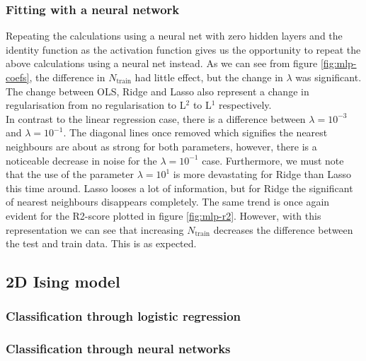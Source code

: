 \subsubsection{Fitting with a neural network}
Repeating the calculations using a neural net with zero hidden layers and the identity function as the activation function gives us the opportunity to repeat the above calculations using a neural net instead. As we can see from figure \ref{fig:mlp-coefs}, the difference in $N_{\text{train}}$ had little effect, but the change in $\lambda$ was significant. The change between OLS, Ridge and Lasso also represent a change in regularisation from no regularisation to L$^2$ to L$^1$ respectively. \\
In contrast to the linear regression case, there is a difference between $\lambda = 10^{-3}$ and $\lambda = 10^{-1}$. The diagonal lines once removed which signifies the nearest neighbours are about as strong for both parameters, however, there is a noticeable decrease in noise for the $\lambda = 10^{-1}$ case. Furthermore, we must note that the use of the parameter $\lambda = 10^{1}$ is more devastating for Ridge than Lasso this time around. Lasso looses a lot of information, but for Ridge the significant of nearest neighbours disappears completely. The same trend is once again evident for the R2-score plotted in figure \ref{fig:mlp-r2}. However, with this representation we can see that increasing $N_{\text{train}}$ decreases the difference between the test and train data. This is as expected.
\subsection{2D Ising model}
\subsubsection{Classification through logistic regression}
\subsubsection{Classification through neural networks}
% 